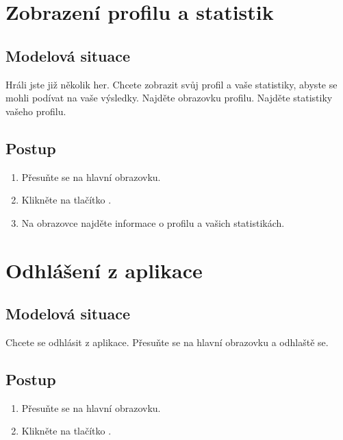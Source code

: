 \section{Zobrazení profilu a statistik}

\subsection*{Modelová situace}

Hráli jste již několik her.
Chcete zobrazit svůj profil a vaše statistiky,
abyste se mohli podívat na vaše výsledky.
Najděte obrazovku profilu.
Najděte statistiky vašeho profilu.

\subsection*{Postup}

\begin{enumerate}
    \item Přesuňte se na hlavní obrazovku.
    \item Klikněte na tlačítko .
    \item Na obrazovce najděte informace o profilu a vašich statistikách.
\end{enumerate}

\section{Odhlášení z aplikace}

\subsection*{Modelová situace}

Chcete se odhlásit z aplikace.
Přesuňte se na hlavní obrazovku a odhlaště se.

\subsection*{Postup}

\begin{enumerate}
    \item Přesuňte se na hlavní obrazovku.
    \item Klikněte na tlačítko .
\end{enumerate}
